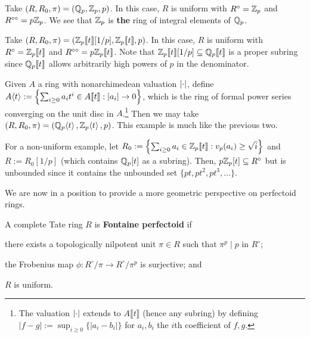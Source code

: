 \documentclass[11pt]{article}
\newcommand{\FPS}[1]{\llbracket{#1}\rrbracket}
\begin{document}
\begin{example}
\hfill
\begin{enum}{\arabic}
\item Take $(R,R_0,\pi)=(\mathbb{Q}_p,\mathbb{Z}_p,p)$. In this case, $R$ is uniform with $R^{\circ}=\mathbb{Z}_p$ and $R^{\circ\circ}=p\mathbb{Z}_p$. We see that $\mathbb{Z}_p$ is \textbf{the} ring of integral elements of $\mathbb{Q}_p$.

\item Take $(R,R_0,\pi)=(\Z_p\FPS{t}[1/p],\Z_p\FPS{t},p)$. In this case, $R$ is uniform with $R^{\circ}=\Z_p\FPS{t}$ and $R^{\circ\circ}=p\Z_p\FPS{t}$. Note that $\Z_p\FPS{t}[1/p]\subset\Q_p\FPS{t}$ is a proper subring since $\Q_p\FPS{t}$ allows arbitrarily high powers of $p$ in the denominator.

\item Given $A$ a ring with nonarchimedean valuation $\left\lvert\cdot\right\rvert$, define $A\ip{t}:=\left\{\sum_{i\geq0}a_it^i\in A\FPS{t} : |a_i|\to0\right\}$, which is the ring of formal power series converging on the unit disc in $A$.\footnote{The valuation $\left\lvert\cdot\right\rvert$ extends to $A\FPS{t}$ (hence any subring) by defining $|f-g|:=\sup_{i\geq0}\{|a_i-b_i|\}$ for $a_i,b_i$ the $i$th coefficient of $f,g$.} Then we may take $(R,R_0,\pi)=(\mathbb{Q}_p\!\left\langle t\right\rangle,\mathbb{Z}_p\!\left\langle t\right\rangle,p)$. This example is much like the previous two.

\item For a non-uniform example, let $R_0:=\left\{\sum_{i\geq0}a_i\in\Z_p\FPS{t} : v_p(a_i)\geq\sqrt{i}\right\}$ and $R:=R_0[1/p]$ (which contains $\mathbb{Q}_p[t]$ as a subring). Then, $p\mathbb{Z}_p[t]\subseteq R^{\circ}$ but is unbounded since it contains the unbounded set $\{pt,pt^2,pt^3,\ldots\}$. %
\end{enum}
\end{example}

We are now in a position to provide a more geometric perspective on perfectoid rings.

\begin{definition}
A complete Tate ring $R$ is \textbf{Fontaine perfectoid} if 
\begin{enum}{\arabic}
\item there exists a topologically nilpotent unit $\pi\in R$ such that $\pi^p\mid p$ in $R^{\circ}$;
\item the Frobenius map $\phi: R^{\circ}/\pi\to R^{\circ}/\pi^p$ is surjective; and 
\item $R$ is uniform.
\end{enum}
\end{definition}
\end{document}
